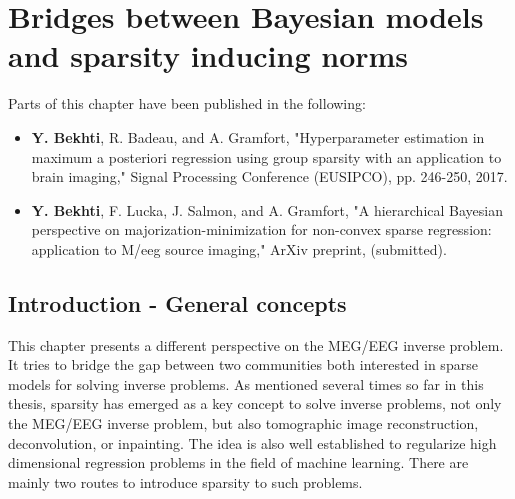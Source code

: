 
\chapter{Bridges between Bayesian models and sparsity inducing norms}
\label{chapter:bayesian}
\noindent\makebox[\linewidth]{\rule{0.75\paperwidth}{0.4pt}}
\noindent\makebox[\linewidth]{\rule{0.75\paperwidth}{0.4pt}}

\localtableofcontents %

\noindent\makebox[\linewidth]{\rule{0.75\paperwidth}{0.4pt}}
\noindent\makebox[\linewidth]{\rule{0.75\paperwidth}{0.4pt}}

\newpage
\vspace{1.5cm}
Parts of this chapter have been published in the following:
\begin{itemize}
\item \textbf{Y. Bekhti}, R. Badeau, and A. Gramfort, "Hyperparameter estimation in maximum a posteriori regression using group sparsity with an application to brain imaging," Signal Processing Conference (EUSIPCO), pp. 246-250, 2017.
\item \textbf{Y. Bekhti}, F. Lucka, J. Salmon, and A. Gramfort, "A hierarchical Bayesian perspective on majorization-minimization for non-convex sparse regression: application to M/\ac{eeg} source imaging," ArXiv preprint, (submitted).
\end{itemize}

\section{Introduction - General concepts}
\label{sec:bayes_intro}

This chapter presents a different perspective on the MEG/EEG inverse problem. It tries to bridge the gap between two communities both interested in sparse models for solving inverse problems. As mentioned several times so far in this thesis, sparsity has emerged as a key concept to solve inverse problems, not only the MEG/EEG inverse problem, but also tomographic image reconstruction, deconvolution, or inpainting. The idea is also well established to regularize high dimensional regression problems in the field of machine learning. There are mainly two routes to introduce sparsity to such problems.

